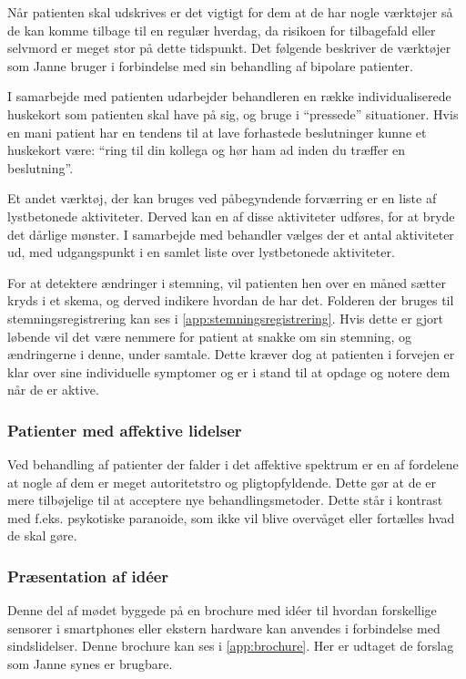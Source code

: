 Når patienten skal udskrives er det vigtigt for dem at de har nogle værktøjer så de kan komme tilbage til en regulær hverdag, da risikoen for tilbagefald eller selvmord er meget stor på dette tidspunkt. 
Det følgende beskriver de værktøjer som Janne bruger i forbindelse med sin behandling af bipolare patienter.
\begin{description}[style=nextline]
	\item[Huskekort] I samarbejde med patienten udarbejder behandleren en række individualiserede huskekort som patienten skal have på sig, og bruge i ``pressede'' situationer. 
	Hvis en mani patient har en tendens til at lave forhastede beslutninger kunne et huskekort være: ``ring til din kollega og hør ham ad inden du træffer en beslutning''.
	
	\item[Lystbetonede aktiviteter] Et andet værktøj, der kan bruges ved påbegyndende forværring er en liste af lystbetonede aktiviteter.
	Derved kan en af disse aktiviteter udføres, for at bryde det dårlige mønster.
	I samarbejde med behandler vælges der et antal aktiviteter ud, med udgangspunkt i en samlet liste over lystbetonede aktiviteter.
	
	\item[Stemningsregistrering] For at detektere ændringer i stemning, vil patienten hen over en måned sætter kryds i et skema, og derved indikere hvordan de har det.
	Folderen der bruges til stemningsregistrering kan ses i \cref{app:stemningsregistrering}.
	Hvis dette er gjort løbende vil det være nemmere for patient at snakke om sin stemning, og ændringerne i denne, under samtale.
	Dette kræver dog at patienten i forvejen er klar over sine individuelle symptomer og er i stand til at opdage og notere dem når de er aktive.
\end{description}

\subsubsection{Patienter med affektive lidelser}
Ved behandling af patienter der falder i det affektive spektrum er en af fordelene at nogle af dem er meget autoritetstro og pligtopfyldende.
Dette gør at de er mere tilbøjelige til at acceptere nye behandlingsmetoder.
Dette står i kontrast med f.eks. psykotiske paranoide, som ikke vil blive overvåget eller fortælles hvad de skal gøre.

\subsubsection{Præsentation af idéer}\label{janne_ideer}
Denne del af mødet byggede på en brochure med idéer til hvordan forskellige sensorer i smartphones eller ekstern hardware kan anvendes i forbindelse med sindslidelser. 
Denne brochure kan ses i \cref{app:brochure}.
Her er udtaget de forslag som Janne synes er brugbare.

